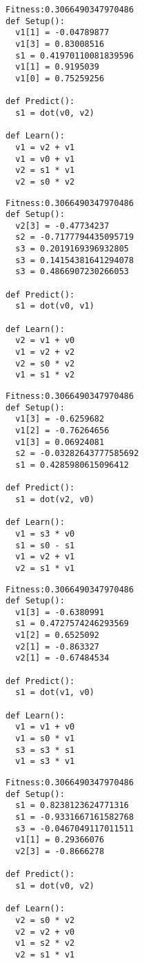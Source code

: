 \documentclass[twocolumn, a4j]{jarticle}
\begin{document}
\newpage

\begin{lstlisting}[caption= No. 0.21]
Fitness:0.3066490347970486 
def Setup():
  v1[1] = -0.04789877
  v1[3] = 0.83008516
  s1 = 0.41970110081839596
  v1[1] = 0.9195039
  v1[0] = 0.75259256

def Predict():
  s1 = dot(v0, v2)

def Learn():
  v1 = v2 + v1
  v1 = v0 + v1
  v2 = s1 * v1
  v2 = s0 * v2

\end{lstlisting}

\begin{lstlisting}[caption= No. 0.22]
Fitness:0.3066490347970486 
def Setup():
  v2[3] = -0.47734237
  s2 = -0.7177794435095719
  s3 = 0.2019169396932805
  s3 = 0.14154381641294078
  s3 = 0.4866907230266053

def Predict():
  s1 = dot(v0, v1)

def Learn():
  v2 = v1 + v0
  v1 = v2 + v2
  v2 = s0 * v2
  v1 = s1 * v2

\end{lstlisting}

\newpage

\begin{lstlisting}[caption= No. 0.23]
Fitness:0.3066490347970486 
def Setup():
  v1[3] = -0.6259682
  v1[2] = -0.76264656
  v1[3] = 0.06924081
  s2 = -0.03282643777585692
  s1 = 0.4285980615096412

def Predict():
  s1 = dot(v2, v0)

def Learn():
  v1 = s3 * v0
  s1 = s0 - s1
  v1 = v2 + v1
  v2 = s1 * v1

\end{lstlisting}

\begin{lstlisting}[caption= No. 0.24]
Fitness:0.3066490347970486 
def Setup():
  v1[3] = -0.6380991
  s1 = 0.4727574246293569
  v1[2] = 0.6525092
  v2[1] = -0.863327
  v2[1] = -0.67484534

def Predict():
  s1 = dot(v1, v0)

def Learn():
  v1 = v1 + v0
  v1 = s0 * v1
  s3 = s3 * s1
  v1 = s3 * v1

\end{lstlisting}

\newpage

\begin{lstlisting}[caption= No. 0.25]
Fitness:0.3066490347970486 
def Setup():
  s1 = 0.8238123624771316
  s1 = -0.9331667161582768
  s3 = -0.0467049117011511
  v1[1] = 0.29366076
  v2[3] = -0.8666278

def Predict():
  s1 = dot(v0, v2)

def Learn():
  v2 = s0 * v2
  v2 = v2 + v0
  v1 = s2 * v2
  v2 = s1 * v1

\end{lstlisting}
\end{document}
